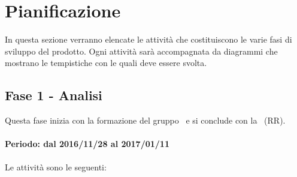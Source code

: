 \documentclass[../PianoDiProgetto.tex]{subfiles}
\begin{document}
\section{Pianificazione}
In questa sezione verranno elencate le attività che costituiscono le varie fasi di sviluppo del prodotto. Ogni attività sarà accompagnata da diagrammi che mostrano le tempistiche con le quali deve essere svolta.
	
	\subsection{Fase 1 - Analisi}
Questa fase inizia con la formazione del gruppo \kpanic\ e si conclude con la \textbf{\revisionedeirequisiti}\ (RR).\\
\\
\textbf{Periodo: dal 2016/11/28 al 2017/01/11}
\\
\\
Le attività sono le seguenti:
\end{document}
